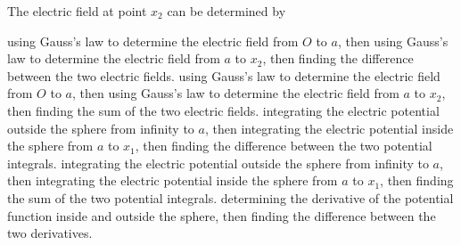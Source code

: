 \documentclass{../../oss-apphys-exam}
\begin{document}
\begin{multicols*}{2}
\begin{questions}
    \columnbreak
    
    \question The electric field at point $x_2$ can be determined by
    \begin{choices}
      \choice using Gauss's law to determine the electric field from $O$ to $a$,
      then using Gauss's law to determine the electric field from $a$ to $x_2$,
      then finding the difference between the two electric fields.
      \choice using Gauss's law to determine the electric field from $O$ to $a$,
      then using Gauss's law to determine the electric field from $a$ to $x_2$,
      then finding the sum of the two electric fields.
      \choice integrating the electric potential outside the sphere from
      infinity to $a$, then integrating the electric potential inside the
      sphere from $a$ to $x_1$, then finding the difference between the two
      potential integrals.
      \choice integrating the electric potential outside the sphere from
      infinity to $a$, then integrating the electric potential inside the
      sphere from $a$ to $x_1$, then finding the sum of the two potential
      integrals.
      \choice determining the derivative of the potential function inside and
      outside the sphere, then finding the difference between the two
      derivatives.
    \end{choices}
    \label{sphere1}
    

\end{questions}
\end{multicols*}
\end{document}
